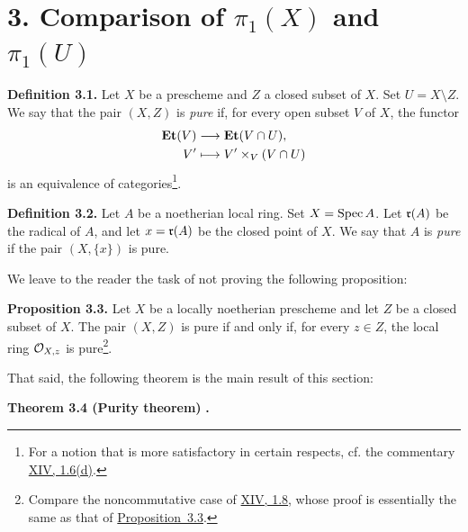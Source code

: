 \section*{3. Comparison of $\pi_1(X)$ and $\pi_1(U)$}

\medskip
{}\noindent\textbf{Definition 3.1.}\quad
Let $X$ be a prescheme and $Z$ a closed subset of $X$. Set
$U=X\setminus Z$. We say that the pair $(X,Z)$ is \emph{pure} if, for every
open subset $V$ of $X$, the functor
\[
\begin{aligned}
  \mathbf{Et}(V)&\longrightarrow\mathbf{Et}(V\cap U),\\
  V'&\longmapsto V'\times_V(V\cap U)
\end{aligned}
\]
is an equivalence of categories\renewcommand{\thefootnote}{*}\footnote{For a
notion that is more satisfactory in certain respects, cf. the commentary
\hyperref[XIV.1.6]{XIV, 1.6(d)}.}.

\medskip
{}

\medskip
{}\noindent\textbf{Definition 3.2.}\quad
Let $A$ be a noetherian local ring. Set $X=\operatorname{Spec} A$. Let $\mathfrak{r}(A)$ be the
radical of $A$, and let $x=\mathfrak{r}(A)$ be the closed point of $X$. We say that
$A$ is \emph{pure} if the pair $(X,\{x\})$ is pure.

\medskip
\noindent We leave to the reader the task of not proving the following
proposition:

\medskip
{}\noindent\textbf{Proposition 3.3.}\quad
Let $X$ be a locally noetherian prescheme and let $Z$ be a closed subset of
$X$. The pair $(X,Z)$ is pure if and only if, for every $z\in Z$, the local
ring $\mathcal O_{X,z}$ is pure\renewcommand{\thefootnote}{**}\footnote{Compare the
noncommutative case of \hyperref[XIV.1.8]{XIV, 1.8}, whose proof is essentially the same as that
of \hyperref[X.3.3]{Proposition~3.3}.}.

\medskip
{}

\medskip
\noindent That said, the following theorem is the main result of this
section:

\medskip
{}\noindent\textbf{Theorem 3.4 (Purity theorem)}%
\textbf{.}

